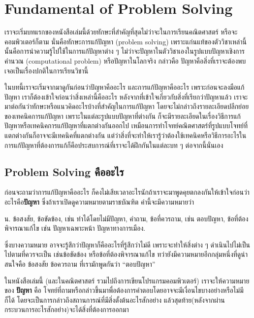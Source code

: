 \chapter{Fundamental of Problem Solving}

เราจะเริ่มบทแรกของหนังสือเล่มนี้ด้วยทักษะที่สำคัญที่สุดไม่ว่าจะในการเรียนคณิตศาสตร์ หรือจะคอมพิวเตอร์ก็ตาม นั่นคือทักษะการแก้ปัญหา (problem solving) เพราะแก่นแท้ของตัววิชาเหล่านี้นั้นคือการนำความรู้ไปใช้ในการแก้ปัญหาต่าง ๆ ไม่ว่าจะปัญหาในตัววิชาเองในรูปแบบปัญหาเชิงการคำนวณ (computational problem) หรือปัญหาในโลกจริง กล่าวคือ ปัญหาคือสิ่งที่เราจะต้องพบเจอเป็นเรื่องปกติในการเรียนวิชานี้

ในบทนี้เราจะเริ่มจากมาดูกันก่อนว่าปัญหาคืออะไร และการแก้ปัญหาคืออะไร เพราะก่อนจะลงมือแก้ปัญหา เราก็ต้องเข้าใจก่อนว่าสิ่งเหล่านี้คืออะไร หลังจากที่เข้าใจเกี่ยวกับสิ่งที่เรียกว่าปัญหาแล้ว เราจะมาต่อกันว่าทักษะหรือแนวคิดอะไรบ้างที่สำคัญในการแก้ปัญหา โดยจะไม่กล่าวถึงรายละเอียดปลีกย่อยของเทคนิคการแก้ปัญหา เพราะในแต่ละรูปแบบปัญหาที่ต่างกัน ก็จะมีรายละเอียดในเรื่องวิธีการแก้ปัญหาหรือเทคนิคการแก้ปัญหาที่แตกต่างกันออกไป เหมือนการทำโจทย์คณิตศาสตร์ที่รูปแบบโจทย์ที่แตกต่างกันก็อาจจะมีเทคนิคที่แตกต่างกัน แต่ว่าสิ่งที่จะทำให้เรารู้ว่าต้องใช้เทคนิคหรือวิธีการอะไรในการแก้ปัญหาที่ต้องการแก้ก็คือประสบการณ์ที่เราจะได้ฝึกกันในแต่ละบท ๆ ต่อจากนี้นั่นเอง

\section{Problem Solving คืออะไร}

ก่อนจะถามว่าการแก้ปัญหาคืออะไร ก็คงไม่เสียเวลาอะไรนักถ้าเราจะมาพูดคุยตกลงกันให้เข้าใจก่อนว่า อะไรคือ\textbf{ปัญหา} ซึ่งถ้าเราเปิดดูความหมายตามราชบัณฑิต คำนี้จะมีความหมายว่า
\begin{center}
	น. ข้อสงสัย, ข้อขัดข้อง, เช่น ทำได้โดยไม่มีปัญหา, คำถาม, ข้อที่ควรถาม, เช่น ตอบปัญหา, ข้อที่ต้องพิจารณาแก้ไข เช่น ปัญหาเฉพาะหน้า ปัญหาทางการเมือง.
\end{center}
ซึ่งบางความหมาย อาจจะรู้สึกว่าปัญหาก็คืออะไรที่รู้สึกว่าไม่ดี เพราะจะทำให้สิ่งต่าง ๆ ดำเนินไปไม่เป็นไปตามที่ควรจะเป็น เช่นข้อขัดข้อง หรือข้อที่ต้องพิจารณาแก้ไข ทว่ายังมีความหมายอีกกลุ่มหนึ่งที่ดูน่าสนใจคือ ข้อสงสัย ข้อควรถาม ที่เรามักพูดกันว่า ``ตอบปัญหา''

ในหนังสือเล่มนี้ (และในคณิตศาสตร์ รวมไปถึงการเขียนโปรแกรมคอมพิวเตอร์) เราจะให้ความหมายของ \textbf{ปัญหา} คือ โจทย์ที่ถามหรือกล่าวขึ้นมาพื่อต้องการคำตอบโดยอาจจะมีเงื่อนไขบางอย่างหรือไม่มีก็ได้ โดยจะเป็นการกล่าวถึงสถานการณ์ที่มีสิ่งตั้งต้นอะไรสักอย่าง แล้วสุดท้าย(หลังจากผ่านกระบวนการอะไรสักอย่าง)จะได้สิ่งที่ต้องการออกมา

